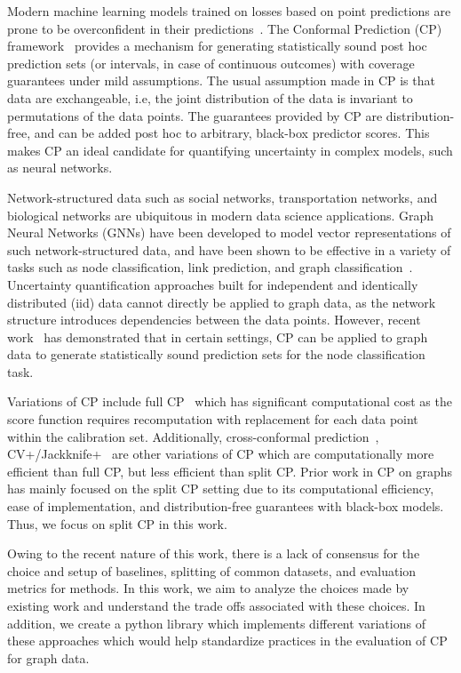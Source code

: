 Modern machine learning models trained on losses based on point predictions are prone to be overconfident in their predictions~\citep{guo2017calibration}. 
The Conformal Prediction (CP) framework~\citep{vovk2005algorithmic} provides a mechanism for generating statistically sound post hoc prediction sets (or intervals, in case of continuous outcomes) with coverage guarantees under mild assumptions.
The usual assumption made in CP is that data are exchangeable, i.e, the joint distribution of the data is invariant to permutations of the data points.
The guarantees provided by CP are distribution-free, and can be added post hoc to arbitrary, black-box predictor scores.
This makes CP an ideal candidate for quantifying uncertainty in complex models, such as neural networks.

Network-structured data such as social networks, transportation networks, and biological networks are ubiquitous in modern data science applications.
Graph Neural Networks (GNNs) have been developed to model vector representations of such network-structured data, and have been shown to be effective in a variety of tasks such as node classification, link prediction, and graph classification~\citep{hamilton2020graph, wu2022graph}.
Uncertainty quantification approaches built for independent and identically distributed (iid) data cannot directly be applied to graph data, as the network structure introduces dependencies between the data points.
However, recent work~\citep{clarkson2023distribution,zargarbashi23conformal,huang2024uncertainty} has demonstrated that in certain settings, CP can be applied to graph data to generate statistically sound prediction sets for the node classification task.

Variations of CP include full CP~\citep{vovk2005algorithmic} which has significant computational cost as the score function requires recomputation with replacement for each data point within the calibration set.
 Additionally, cross-conformal prediction~\citep{vovk2015cross}, CV+/Jackknife+~\citep{barber2021predictive} are other variations of CP which are computationally more efficient than full CP, but less efficient than split CP.
 Prior work in CP on graphs has mainly focused on the split CP setting due to its computational efficiency, ease of implementation, and distribution-free guarantees with black-box models. 
 Thus, we focus on split CP in this work.

Owing to the recent nature of this work, there is a lack of consensus for the choice and setup of baselines, splitting of common datasets, and evaluation metrics for methods.
In this work, we aim to analyze the choices made by existing work and understand the trade offs associated with these choices.
In addition, we create a python library which implements different variations of these approaches which would help standardize practices in the evaluation of CP for graph data.
